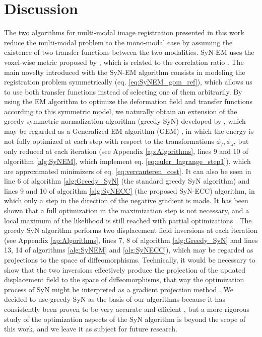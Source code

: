 \section{Discussion}
The two algorithms for multi-modal image registration presented in this work reduce the multi-modal problem to the mono-modal case by assuming the existence of two transfer functions between the two modalities. SyN-EM uses the voxel-wise metric proposed by \cite{Arce-santana2014}, which is related to the correlation ratio \citep{Roche1998}. The main novelty introduced with the SyN-EM algorithm consists in modeling the registration problem symmetrically (eq. \eqref{eq:SyNEM_gom_ref}), which allows us to use both transfer functions instead of selecting one of them arbitrarily. By using the EM algorithm to optimize the deformation field and transfer functions according to this symmetric model, we naturally obtain an extension of the greedy symmetric normalization algorithm (greedy SyN) developed by \cite{Avants2008, Avants2011}, which may be regarded as a Generalized EM algorithm (GEM) \citep{Neal1998}, in which the energy is not fully optimized at each step with respect to the transformations $\phi_{I}, \phi_{J}$, but only reduced at each iteration (see Appendix \ref{ap:Algorithms}, lines 9 and 10 of algorithm \ref{alg:SyNEM}, which implement eq. \eqref{eq:euler_lagrange_step1}), which are approximated minimizers of eq. \eqref{eq:vercauteren_cost}. It can also be seen in line 6 of algorithm \ref{alg:Greedy_SyN} (the standard greedy SyN algorithm) and lines 9 and 10 of algorithm \ref{alg:SyNECC} (the proposed SyN-ECC) algorithm, in which only a step in the direction of the negative gradient is made. It has been shown that a full optimization in the maximization step is not necessary, and a local maximum of the likelihood is still reached with partial optimizations \citep{Neal1998}. The greedy SyN algorithm performs two displacement field inversions at each iteration (see Appendix \ref{ap:Algorithms}, lines 7, 8 of algorithm \ref{alg:Greedy_SyN} and lines 13, 14 of algorithms \ref{alg:SyNEM} and \ref{alg:SyNECC}), which may be regarded as projections to the space of diffeomorphisms. Technically, it would be necessary to show that the two inversions effectively produce the projection of the updated displacement field to the space of diffeomorphisms, that way the optimization process of SyN might be interpreted as a gradient projection method \citep{Xiu2007}. We decided to use greedy SyN as the basis of our algorithms because it has consistently been proven to be very accurate and efficient \citep{Klein2009, Klein2010, Rohlfing2012}, but a more rigorous study of the optimization aspects of the SyN algorithm is beyond the scope of this work, and we leave it as subject for future research.\\

